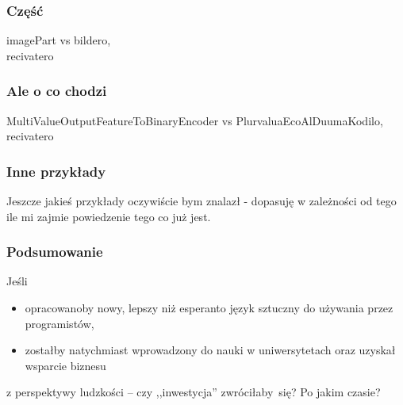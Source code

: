 \documentclass{beamer}
\begin{document}
  \begin{frame}
  	\frametitle{Część}

	imagePart vs bildero,\\
	recivatero
  \end{frame}
  
  \begin{frame}
  	\frametitle{Ale o co chodzi}

	MultiValueOutputFeatureToBinaryEncoder vs PlurvaluaEcoAlDuumaKodilo,\\
	recivatero
  \end{frame}
  
  \begin{frame}
    \frametitle{Inne przykłady}
	
	Jeszcze jakieś przykłady oczywiście bym znalazł - dopasuję w zależności od tego ile mi zajmie powiedzenie tego co już jest.
  \end{frame}  
  
  \begin{frame}
  	\frametitle{Podsumowanie}
  	Jeśli 
  	\begin{itemize}
  		\item opracowanoby nowy, lepszy niż esperanto język sztuczny do używania przez programistów,
  		\item zostałby natychmiast wprowadzony do nauki w uniwersytetach oraz uzyskał wsparcie biznesu
  	\end{itemize}
  	
  	z perspektywy ludzkości -- czy ,,inwestycja'' zwróciłaby~się? Po jakim czasie?
  \end{frame}
\end{document}
